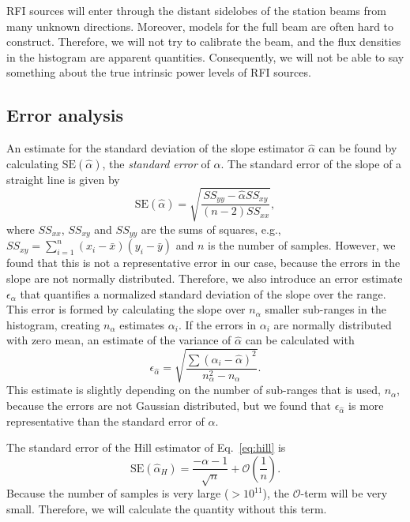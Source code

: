 \documentclass[useAMS,usenatbib]{mn2e}
\begin{document}
RFI sources will enter through the distant sidelobes of the station beams from many unknown directions. Moreover, models for the full beam are often hard to construct. Therefore, we will not try to calibrate the beam, and the flux densities in the histogram are apparent quantities. Consequently, we will not be able to say something about the true intrinsic power levels of RFI sources.

\subsection{Error analysis}
An estimate for the standard deviation of the slope estimator $\hat \alpha$ can be found by calculating $\textrm{SE}(\hat \alpha)$, the \emph{standard error} of $\hat \alpha$. The standard error of the slope of a straight line \citep[pp. 32--35]{acton-analaysis-of-straight-lines} is given by
\begin{equation} \label{eq:stderr-slope}
 \textrm{SE}(\hat \alpha) = \sqrt{\frac{SS_{yy}-\hat\alpha SS_{xy}}{\left(n - 2\right) SS_{xx}}},
\end{equation}
where $SS_{xx}$, $SS_{xy}$ and $SS_{yy}$ are the sums of squares, e.g., $SS_{xy}=\sum_{i=1}^n (x_i - \bar x) (y_i - \bar y)$ and $n$ is the number of samples. However, we found that this is not a representative error in our case, because the errors in the slope are not normally distributed. Therefore, we also introduce an error estimate $\epsilon_\alpha$ that quantifies a normalized standard deviation of the slope over the range. This error is formed by calculating the slope over $n_\alpha$ smaller sub-ranges in the histogram, creating $n_\alpha$ estimates $\alpha_i$. If the errors in $\alpha_i$ are normally distributed with zero mean, an estimate of the variance of $\hat \alpha$ can be calculated with
\begin{equation}
 \epsilon_{\hat\alpha} = \sqrt{\frac{\sum \left( \alpha_i - \hat\alpha \right)^2 }{n^2_\alpha - n_\alpha}}.
\end{equation}
This estimate is slightly depending on the number of sub-ranges that is used, $n_\alpha$, because the errors are not Gaussian distributed, but we found that $\epsilon_{\hat\alpha}$ is more representative than the standard error of $\hat\alpha$. 

The standard error of the Hill estimator of Eq.~\eqref{eq:hill} is \citep{power-law-distribution}
\begin{equation} \label{eq:stderr-hill}
 \textrm{SE}(\hat \alpha_H) = \frac{-\alpha - 1}{\sqrt{n}} + \mathcal{O}(\frac{1}{n}).
\end{equation}
Because the number of samples is very large ($>10^{11}$), the $\mathcal{O}$-term will be very small. Therefore, we will calculate the quantity without this term.
\end{document}
